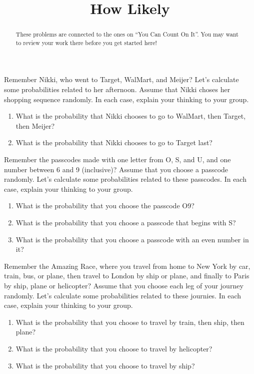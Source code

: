 \documentclass[noauthor,nooutcomes]{ximera}
\title{How Likely}
\begin{document}
\begin{abstract}
These problems are connected to the ones on ``You Can Count On It''. You may want to review your work there before you get started here!
\end{abstract}
\maketitle



\begin{problem}
Remember Nikki, who went to Target, WalMart, and Meijer? Let's calculate some probabilities related to her afternoon. Assume that Nikki choses her shopping sequence randomly. In each case, explain your thinking to your group.

\begin{enumerate}
	\item What is the probability that Nikki chooses to go to WalMart, then Target, then Meijer?
	\item What is the probability that Nikki chooses to go to Target last?
\end{enumerate}
\vfill
\end{problem}

\begin{problem}
Remember the passcodes made with one letter from O, S, and U, and one number between 6 and 9 (inclusive)?
Assume that you choose a passcode randomly. Let's calculate some probabilities related to these passcodes. In each case, explain your thinking to your group.
\begin{enumerate}
	\item What is the probability that you choose the passcode O9?
	\item What is the probability that you choose a passcode that begins with S?
	\item What is the probability that you choose a passcode with an even number in it?
\end{enumerate} \vfill
\end{problem}

\newpage

\begin{problem}
Remember the Amazing Race, where you travel from home to New York by car, train, bus, or plane, then travel to London by ship or plane, and finally to Paris by ship, plane or helicopter? Assume that you choose each leg of your journey randomly. Let's calculate some probabilities related to these journies. In each case, explain your thinking to your group.
\begin{enumerate}
	\item What is the probability that you choose to travel by train, then ship, then plane?
	\item What is the probability that you choose to travel by helicopter?
	\item What is the probability that you choose to travel by ship?
\end{enumerate} \vfill
\end{problem}
\end{document}

